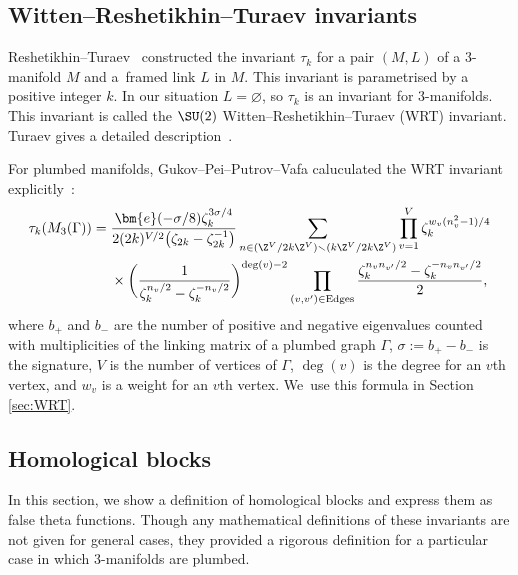 \subsection{Witten--Reshetikhin--Turaev invariants} %

Reshetikhin--Turaev~\cite{RT} constructed the invariant $\tau_{k}$ for a pair $(M, L)$ of a 3-manifold $M$ and a~framed link $L$ in $M$.
This invariant is parametrised by a positive integer $k$.
In our situation \mbox{$L = \varnothing$}, so $\tau_{k}$ is an invariant for 3-manifolds.
This invariant is called the $\SU(2)$ Witten--Reshetikhin--Turaev (WRT) invariant.
Turaev gives a detailed description~\cite{R}.

For plumbed manifolds, Gukov--Pei--Putrov--Vafa caluculated the WRT invariant expli\-ci\-tly~\cite[formula~(A.10)]{GPPV}:
\begin{align*}
	\tau_{k}(M_{3}(\Gamma))
	={}
	&\frac{\bm{e}(-\sigma/8) \zeta_{k}^{3\sigma/4}}{2(2k)^{V/2} \big(\zeta_{2k}-\zeta_{2k}^{-1}\big)}
	\sum_{n \in (\Z^{V} / 2k\Z^{V}) \smallsetminus (k\Z^{V} / 2k\Z^{V})}
	\prod_{v=1}^{V}\zeta_{k}^{w_{v}(n_{v}^{2} - 1) / 4}
	\\
	&\times\bigg( \frac{1}{\zeta_{k}^{n_{v}/2} - \zeta_{k}^{-n_{v}/2}} \bigg)^{\deg(v)-2}
	\prod_{(v, v') \in \mathrm{Edges}} \frac{\zeta_{k}^{n_{v}n_{v'}/2} - \zeta_{k}^{-n_{v}n_{v'}/2}}{2},
\end{align*}
where $ b_+ $ and $ b_- $ are the number of positive and negative eigenvalues counted with multiplicities of the linking matrix of a plumbed graph $\Gamma$,
$\sigma := b_+ - b_- $ is the signature,
$V$ is the number of vertices of $\Gamma$,
$ \deg(v) $ is the degree for an $v$th vertex,
and $w_{v}$ is a weight for an $v$th vertex.
We~use this formula in Section \ref{sec:WRT}.

\subsection{Homological blocks} %

In this section, we show a definition of homological blocks and express them as false theta functions.
Though any mathematical definitions of these invariants are not given for general cases, they provided a rigorous definition for a particular case in which 3-manifolds are plumbed.

